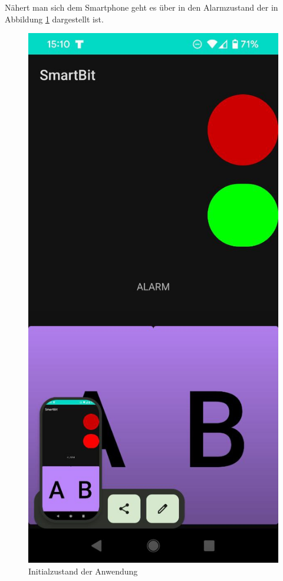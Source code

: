 \documentclass[11pt,a4paper]{report}
\begin{document}
Nähert man sich dem Smartphone geht es über in den Alarmzustand der in Abbildung \ref{fig:app_alarm} dargestellt ist.
\begin{figure}[htbp]
  \centering
  \includegraphics[height=0.4\textheight]{images/app_alarm}
  \caption{Initialzustand der Anwendung}
  \label{fig:app_alarm}
\end{figure}
\end{document}
